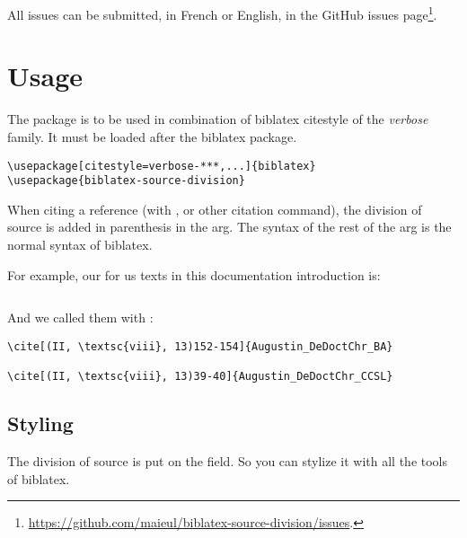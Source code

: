 \documentclass{ltxdockit}[2011/03/25]
\newcommand{\biblatex}{biblatex\xspace}
\begin{document}
All issues can be submitted, in French or English, in the GitHub issues page\footnote{\url{https://github.com/maieul/biblatex-source-division/issues}.}.

\section{Usage}

The package is to be used in combination of \biblatex citestyle of the \emph{verbose} family.
It must be loaded after the \biblatex package.
\begin{verbatim}
\usepackage[citestyle=verbose-***,...]{biblatex}
\usepackage{biblatex-source-division}
\end{verbatim}

When citing a reference (with ,  or other citation command),  the division of source is added in parenthesis in the  arg. The syntax of the rest of the  arg is the normal syntax of \biblatex.

For example, our  for us texts in this documentation introduction is:

\inputminted{tex}{biblatex-source-division.bib}

And we called them with :

\begin{verbatim}
\cite[(II, \textsc{viii}, 13)152-154]{Augustin_DeDoctChr_BA}

\cite[(II, \textsc{viii}, 13)39-40]{Augustin_DeDoctChr_CCSL}
\end{verbatim}

\subsection{Styling}

The division of source is put on the  field. So you can stylize it with all the tools of biblatex.
\end{document}
